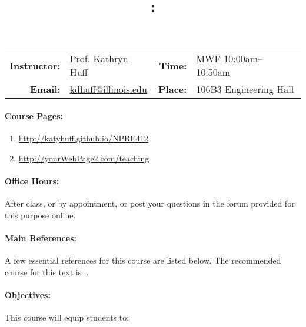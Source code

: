 \documentclass[11pt, a4paper]{article}
\title{\CourseNumber: \CourseTitle\\}
\author{\CourseUniversity}
\date{\CourseSemester \CourseYear}
\makeatletter
\newcommand{\CourseNumber}{NPRE412}
\newcommand{\CourseInstructor}{Prof. Kathryn Huff\xspace}%
\newcommand{\CourseDays}{MWF\xspace}%
\newcommand{\CourseStart}{10:00am\xspace}%
\newcommand{\CourseEnd}{10:50am\xspace}%
\newcommand{\CourseInstructorEmail}{kdhuff@illinois.edu}
\newcommand{\CourseRoom}{106B3\xspace}%
\newcommand{\CourseBuilding}{Engineering Hall\xspace}%
\makeatother
\begin{document}
\maketitle
\renewcommand{\arraystretch}{2}
\begin{center}
\begin{table}[h]
\begin{tabularx}{\textwidth}{rXrX}
\hline
\textbf{Instructor:} & \CourseInstructor & \textbf{Time:} & \CourseDays \CourseStart -- \CourseEnd \\
\textbf{Email:} &  \href{mailto:\CourseInstructorEmail}{\CourseInstructorEmail} & \textbf{Place:} & \CourseRoom \CourseBuilding\\
\hline
\end{tabularx}
\end{table}
\end{center}

\paragraph{Course Pages:}
\begin{enumerate}
\item \url{http://katyhuff.github.io/\CourseNumber}
\item \url{http://yourWebPage2.com/teaching}
\end{enumerate}

\paragraph{Office Hours:} After class, or by appointment, or post your 
questions in the forum provided for this purpose online.

\paragraph{Main References:}
A few essential references for this course are listed below. The recommended 
course for this text is \cite{tsoulfanidis_nuclear_2013}..
\nocite{*}

\renewcommand{\refname}{\normalfont\selectfont\normalsize}\vspace{-1cm} 


\paragraph{Objectives:} 

This course will equip students to:
\end{document}
